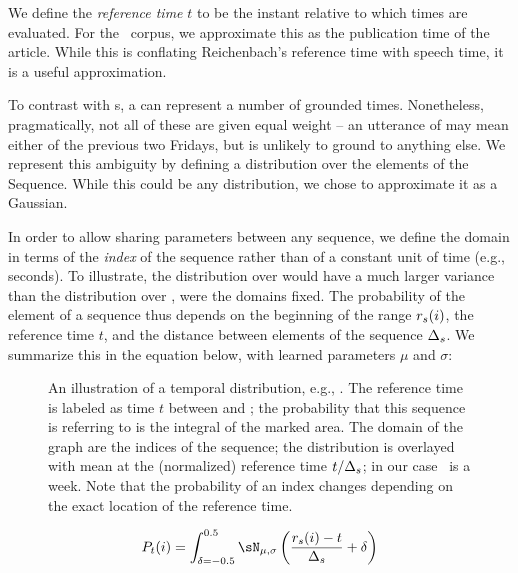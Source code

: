 We define the \textit{reference time} $t$ \cite{key:1947reichenback-temporal}
	to be the instant relative to which times are evaluated.
For the \tempeval\ corpus, we approximate this as the
	publication time of the article.
While this is conflating Reichenbach's reference time with speech time, 
	it is a useful approximation.

To contrast with s, a  can represent a number of grounded
	times.
Nonetheless, pragmatically, not all of these are given equal weight --
	an utterance of  may mean either of the previous two Fridays,
	but is unlikely to ground to anything else.
We represent this ambiguity by defining a distribution over the elements
	of the Sequence.
While this could be any distribution, we chose to approximate it as a
	Gaussian.

In order to allow sharing parameters between any sequence, we define the domain
	in terms of the \textit{index} of the sequence rather than
	of a constant unit of time (e.g., seconds).
To illustrate, the distribution over  would have a much larger
	variance than the distribution over , were the domains
	fixed.
The probability of the  element of a sequence thus depends on
	the beginning of the range $r_s(i)$, 
	the reference time $t$, 
	and the distance between elements of the sequence $\Delta_s$.
We summarize this in the equation below, with learned parameters
	$\mu$ and $\sigma$:

\begin{figure}[t]
\begin{center}
	\resizebox{1.1\hsize}{!}{
		
	}
	\caption{
		\label{fig:distribution}
		An illustration of a temporal distribution, e.g., .
		The reference time is labeled as time $t$ between  and 
			; the probability that this sequence is referring to
			 is the integral of the marked area.
		The domain of the graph are the indices of the sequence;
			the distribution is overlayed with mean at the (normalized) reference time
			$t / \Delta_s$; in our case \seqjump\ is a week.
		Note that the probability of an index changes depending on the exact location
		of the reference time.
	}
\end{center}
\end{figure}

\begin{equation}
\label{eqn:gaussian}
	P_t(i) = 
	\int_{\delta=-0.5}^{0.5}
		\sN_{\mu,\sigma}\left(\frac{\seqelem(i) - t}{\seqjump} + \delta \right)
\end{equation}

